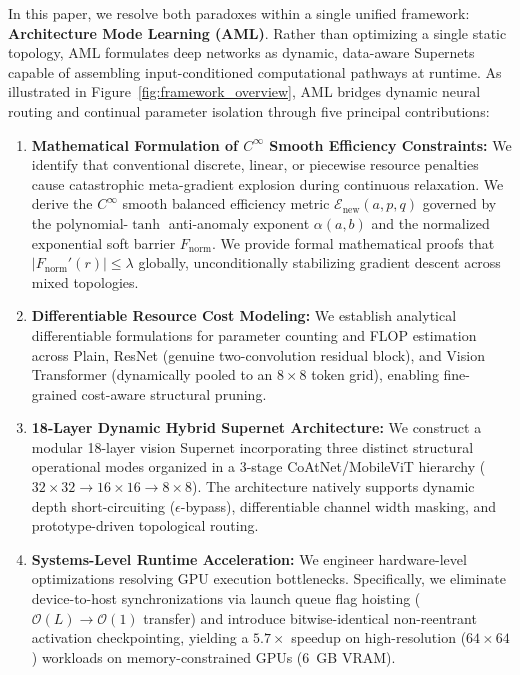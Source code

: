 \documentclass[11pt, a4paper]{article}
\begin{document}
In this paper, we resolve both paradoxes within a single unified framework: \textbf{Architecture Mode Learning (AML)}. Rather than optimizing a single static topology, AML formulates deep networks as dynamic, data-aware Supernets capable of assembling input-conditioned computational pathways at runtime. As illustrated in Figure~\ref{fig:framework_overview}, AML bridges dynamic neural routing and continual parameter isolation through five principal contributions:

\begin{enumerate}
    \item \textbf{Mathematical Formulation of $C^\infty$ Smooth Efficiency Constraints:} We identify that conventional discrete, linear, or piecewise resource penalties cause catastrophic meta-gradient explosion during continuous relaxation. We derive the $C^\infty$ smooth balanced efficiency metric $\mathcal{E}_{\text{new}}(a, p, q)$ governed by the polynomial-$\tanh$ anti-anomaly exponent $\alpha(a, b)$ and the normalized exponential soft barrier $F_{\text{norm}}$. We provide formal mathematical proofs that $|F_{\text{norm}}'(r)| \le \lambda$ globally, unconditionally stabilizing gradient descent across mixed topologies.
    \item \textbf{Differentiable Resource Cost Modeling:} We establish analytical differentiable formulations for parameter counting and FLOP estimation across Plain, ResNet (genuine two-convolution residual block), and Vision Transformer (dynamically pooled to an $8{\times}8$ token grid), enabling fine-grained cost-aware structural pruning.
    \item \textbf{18-Layer Dynamic Hybrid Supernet Architecture:} We construct a modular 18-layer vision Supernet incorporating three distinct structural operational modes organized in a 3-stage CoAtNet/MobileViT hierarchy ($32\times 32 \to 16\times 16 \to 8\times 8$). The architecture natively supports dynamic depth short-circuiting ($\epsilon$-bypass), differentiable channel width masking, and prototype-driven topological routing.
    \item \textbf{Systems-Level Runtime Acceleration:} We engineer hardware-level optimizations resolving GPU execution bottlenecks. Specifically, we eliminate device-to-host synchronizations via launch queue flag hoisting ($\mathcal{O}(L) \to \mathcal{O}(1)$ transfer) and introduce bitwise-identical non-reentrant activation checkpointing, yielding a $5.7\times$ speedup on high-resolution ($64\times 64$) workloads on memory-constrained GPUs (6~GB VRAM).

\end{enumerate}
\end{document}
